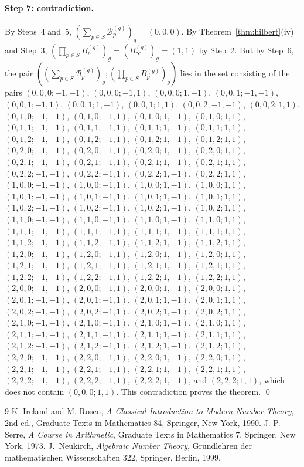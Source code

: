 \documentclass[11pt]{article}
\begin{document}
\paragraph{Step 7: contradiction.} By Steps~4 and~5, $(\sum_{p\in S}\mathcal B^{(g)}_p)_g=(0,0,0)$. By Theorem~\ref{thm:hilbert}(iv) and Step~3, $(\prod_{p\in S}B^{(g)}_p)_g=(B^{(g)}_\infty)_g=(1,1)$ by Step~2. But by Step~6, the pair $(\textstyle(\sum_{p\in S}\mathcal B^{(g)}_p)_g;(\prod_{p\in S}B^{(g)}_p)_g)$ lies in the set consisting of the pairs $(0,0,0;-1,-1)$, $(0,0,0;-1,1)$, $(0,0,0;1,-1)$, $(0,0,1;-1,-1)$, $(0,0,1;-1,1)$, $(0,0,1;1,-1)$, $(0,0,1;1,1)$, $(0,0,2;-1,-1)$, $(0,0,2;1,1)$, $(0,1,0;-1,-1)$, $(0,1,0;-1,1)$, $(0,1,0;1,-1)$, $(0,1,0;1,1)$, $(0,1,1;-1,-1)$, $(0,1,1;-1,1)$, $(0,1,1;1,-1)$, $(0,1,1;1,1)$, $(0,1,2;-1,-1)$, $(0,1,2;-1,1)$, $(0,1,2;1,-1)$, $(0,1,2;1,1)$, $(0,2,0;-1,-1)$, $(0,2,0;-1,1)$, $(0,2,0;1,-1)$, $(0,2,0;1,1)$, $(0,2,1;-1,-1)$, $(0,2,1;-1,1)$, $(0,2,1;1,-1)$, $(0,2,1;1,1)$, $(0,2,2;-1,-1)$, $(0,2,2;-1,1)$, $(0,2,2;1,-1)$, $(0,2,2;1,1)$, $(1,0,0;-1,-1)$, $(1,0,0;-1,1)$, $(1,0,0;1,-1)$, $(1,0,0;1,1)$, $(1,0,1;-1,-1)$, $(1,0,1;-1,1)$, $(1,0,1;1,-1)$, $(1,0,1;1,1)$, $(1,0,2;-1,-1)$, $(1,0,2;-1,1)$, $(1,0,2;1,-1)$, $(1,0,2;1,1)$, $(1,1,0;-1,-1)$, $(1,1,0;-1,1)$, $(1,1,0;1,-1)$, $(1,1,0;1,1)$, $(1,1,1;-1,-1)$, $(1,1,1;-1,1)$, $(1,1,1;1,-1)$, $(1,1,1;1,1)$, $(1,1,2;-1,-1)$, $(1,1,2;-1,1)$, $(1,1,2;1,-1)$, $(1,1,2;1,1)$, $(1,2,0;-1,-1)$, $(1,2,0;-1,1)$, $(1,2,0;1,-1)$, $(1,2,0;1,1)$, $(1,2,1;-1,-1)$, $(1,2,1;-1,1)$, $(1,2,1;1,-1)$, $(1,2,1;1,1)$, $(1,2,2;-1,-1)$, $(1,2,2;-1,1)$, $(1,2,2;1,-1)$, $(1,2,2;1,1)$, $(2,0,0;-1,-1)$, $(2,0,0;-1,1)$, $(2,0,0;1,-1)$, $(2,0,0;1,1)$, $(2,0,1;-1,-1)$, $(2,0,1;-1,1)$, $(2,0,1;1,-1)$, $(2,0,1;1,1)$, $(2,0,2;-1,-1)$, $(2,0,2;-1,1)$, $(2,0,2;1,-1)$, $(2,0,2;1,1)$, $(2,1,0;-1,-1)$, $(2,1,0;-1,1)$, $(2,1,0;1,-1)$, $(2,1,0;1,1)$, $(2,1,1;-1,-1)$, $(2,1,1;-1,1)$, $(2,1,1;1,-1)$, $(2,1,1;1,1)$, $(2,1,2;-1,-1)$, $(2,1,2;-1,1)$, $(2,1,2;1,-1)$, $(2,1,2;1,1)$, $(2,2,0;-1,-1)$, $(2,2,0;-1,1)$, $(2,2,0;1,-1)$, $(2,2,0;1,1)$, $(2,2,1;-1,-1)$, $(2,2,1;-1,1)$, $(2,2,1;1,-1)$, $(2,2,1;1,1)$, $(2,2,2;-1,-1)$, $(2,2,2;-1,1)$, $(2,2,2;1,-1)$, and $(2,2,2;1,1)$, which does not contain $(0,0,0;1,1)$. This contradiction proves the theorem.
\qed

\begin{thebibliography}{9}
 K. Ireland and M. Rosen, \emph{A Classical Introduction to Modern Number Theory}, 2nd ed., Graduate Texts in Mathematics 84, Springer, New York, 1990.
 J.-P. Serre, \emph{A Course in Arithmetic}, Graduate Texts in Mathematics 7, Springer, New York, 1973.
 J.~Neukirch, \emph{Algebraic Number Theory}, Grundlehren der mathematischen Wissenschaften 322, Springer, Berlin, 1999.
\end{thebibliography}
\end{document}
